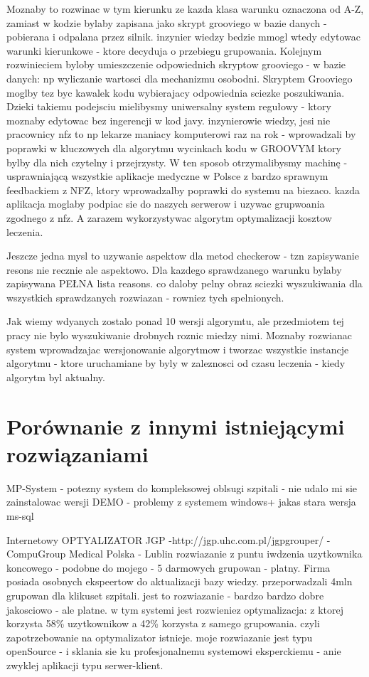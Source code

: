 Moznaby to rozwinac w tym kierunku ze kazda klasa warunku oznaczona od A-Z, zamiast w kodzie bylaby zapisana jako skrypt grooviego w bazie danych - pobierana i odpalana przez silnik. inzynier wiedzy bedzie mmogl wtedy edytowac warunki kierunkowe - ktore decyduja o przebiegu grupowania. Kolejnym rozwinieciem byloby umieszczenie odpowiednich skryptow grooviego - w bazie danych: np wyliczanie wartosci dla mechanizmu osobodni. Skryptem Grooviego moglby tez byc kawalek kodu wybierajacy odpowiednia sciezke poszukiwania. Dzieki takiemu podejsciu mielibysmy uniwersalny system regułowy - ktory moznaby edytowac bez ingerencji w kod javy. inzynierowie wiedzy, jesi nie pracownicy nfz to np lekarze maniacy komputerowi raz na rok - wprowadzali by poprawki w kluczowych dla algorytmu wycinkach kodu w GROOVYM ktory bylby dla nich czytelny i przejrzysty. W ten sposob otrzymalibysmy machinę - usprawniającą wszystkie aplikacje medyczne w Polsce z bardzo sprawnym feedbackiem z NFZ, ktory wprowadzalby poprawki do systemu na biezaco. kazda aplikacja moglaby podpiac sie do naszych serwerow i uzywac grupwoania zgodnego z nfz. A zarazem wykorzystywac algorytm optymalizacji kosztow leczenia.

Jeszcze jedna mysl to uzywanie aspektow dla metod checkerow - tzn zapisywanie resons nie recznie ale aspektowo. Dla kazdego sprawdzanego warunku bylaby zapisywana PEŁNA lista reasons. co daloby pelny obraz sciezki wyszukiwania dla wszystkich sprawdzanych rozwiazan - rowniez tych spelnionych.

Jak wiemy wdyanych zostalo ponad 10 wersji algorymtu, ale przedmiotem tej pracy nie bylo wyszukiwanie drobnych roznic miedzy nimi. Moznaby rozwianac system wprowadzajac wersjonowanie algorytmow i tworzac wszystkie instancje algorytmu - ktore uruchamiane by byly w zaleznosci od czasu leczenia - kiedy algorytm byl aktualny.



\section{Porównanie z innymi istniejącymi rozwiązaniami}
\label{sec:porownanieZinnymiRozwiazaniami}

MP-System - potezny system do kompleksowej oblsugi szpitali - nie udalo mi sie zainstalowac wersji DEMO - problemy z systemem windows+ jakas stara wersja ms-sql

Internetowy OPTYALIZATOR JGP -http://jgp.uhc.com.pl/jgpgrouper/ - CompuGroup Medical Polska - Lublin
rozwiazanie z puntu iwdzenia uzytkownika koncowego - podobne do mojego - 5 darmowych grupowan - platny. Firma posiada osobnych ekspeertow do aktualizacji bazy wiedzy. przeporwadzali 4mln grupowan dla klikuset szpitali. jest to rozwiazanie - bardzo bardzo dobre jakosciowo - ale platne.
w tym systemi jest rozwieniez optymalizacja: z ktorej korzysta 58\% uzytkownikow a 42\% korzysta z samego grupowania. czyli zapotrzebowanie na optymalizator istnieje. moje rozwiazanie jest typu openSource - i sklania sie ku profesjonalnemu systemowi eksperckiemu - anie zwyklej aplikacji typu serwer-klient.


